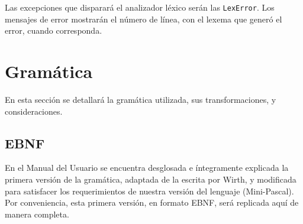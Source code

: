 \documentclass[a4paper,oneside]{report}
\begin{document}
Las excepciones que disparará el analizador léxico serán las \texttt{LexError}. Los mensajes de error mostrarán el número de línea, con el lexema que generó el error, cuando corresponda.

\chapter{Gramática}

En esta sección se detallará la gramática utilizada, sus transformaciones, y consideraciones.

\section{EBNF}

En el Manual del Usuario se encuentra desglosada e íntegramente explicada la primera versión de la gramática, adaptada de la escrita por Wirth, y modificada para satisfacer los requerimientos de nuestra versión del lenguaje (Mini-Pascal). Por conveniencia, esta primera versión, en formato EBNF, será replicada aquí de manera completa.
\end{document}
